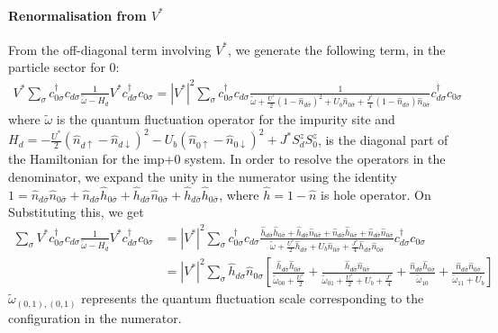 \documentclass{report}
\numberwithin{equation}{section}
\begin{document}
\paragraph{Renormalisation from \({V^*}\)}
From the off-diagonal term involving \({V^*}\), we generate the following term, in the particle sector for \(0\):
\begin{equation}\begin{aligned}
	{V^*} \sum_\sigma c^\dagger_{0\sigma}c_{d\sigma} \frac{1}{\tilde \omega - H_d} {V^*} c^\dagger_{d\sigma}c_{0\sigma} = |V^*|^2 \sum_\sigma c^\dagger_{0\sigma}c_{d\sigma} \frac{1}{\tilde \omega + \frac{U^*}{2}\left( 1 - \hat n_{d\bar\sigma} \right)^2 + U_b \hat n_{0\bar\sigma} + \frac{J^*}{4}\left( 1 - \hat n_{d\bar\sigma} \right) \hat n_{0\bar\sigma} } c^\dagger_{d\sigma}c_{0\sigma}
\end{aligned}\end{equation}
where \(\tilde \omega\) is the quantum fluctuation operator for the impurity site and \(H_d = -\frac{U^*}{2}\left( \hat n_{d \uparrow} - \hat n_{d \downarrow} \right)^2 - U_b \left( \hat n_{0 \uparrow} - \hat n_{0 \downarrow} \right)^2 + J^*S_d^z S_0^z \), is the diagonal part of the Hamiltonian for the imp+0 system. In order to resolve the operators in the denominator, we expand the unity in the numerator using the identity \(1 = \hat n_{d\bar\sigma}\hat n_{0\bar\sigma} + \hat n_{d\bar\sigma}\hat h_{0\bar\sigma} + \hat h_{d\bar\sigma}\hat n_{0\bar\sigma} + \hat h_{d\bar\sigma}\hat h_{0\bar\sigma}\), where \(\hat h = 1 - \hat n\) is hole operator. On Substituting this, we get
\begin{equation}\begin{aligned}
	\sum_\sigma {V^*} c^\dagger_{0\sigma}c_{d\sigma} \frac{1}{\tilde \omega - H_d} {V^*} c^\dagger_{d\sigma}c_{0\sigma} &= |V^*|^2 \sum_\sigma c^\dagger_{0\sigma}c_{d\sigma} \frac{\hat h_{d\bar\sigma}\hat h_{0\bar\sigma} + \hat h_{d\bar\sigma}\hat n_{0\bar\sigma} + \hat n_{d\bar\sigma}\hat h_{0\bar\sigma} + \hat n_{d\bar\sigma}\hat n_{0\bar\sigma}}{\tilde \omega + \frac{U^*}{2}\hat h_{d\bar\sigma} + U_b \hat n_{0\bar\sigma} + \frac{J^*}{4}\hat h_{d\bar\sigma} \hat n_{0\bar\sigma} } c^\dagger_{d\sigma}c_{0\sigma}\\
															    &= |V^*|^2 \sum_\sigma \hat h_{d\sigma} \hat n_{0\sigma}\left[\frac{\hat h_{d\bar\sigma}\hat h_{0\bar\sigma}}{\tilde\omega_{00} + \frac{U^*}{2}} + \frac{\hat h_{d\bar\sigma}\hat n_{0\bar\sigma}}{\tilde\omega_{01} + \frac{U^*}{2} + U_b + \frac{J^*}{4}} + \frac{\hat n_{d\bar\sigma}\hat h_{0\bar\sigma}}{\tilde\omega_{10}} + \frac{\hat n_{d\bar\sigma}\hat n_{0\bar\sigma}}{\tilde\omega_{11} + U_b}\right]
\end{aligned}\end{equation}
\(\tilde\omega_{(0,1),(0,1)}\) represents the quantum fluctuation scale corresponding to the configuration in the numerator.
\end{document}
